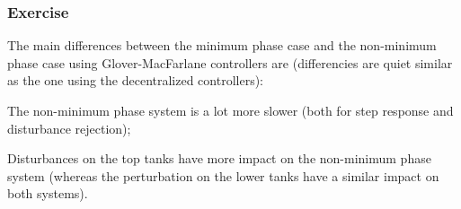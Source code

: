 \subsubsection{Exercise} 

The main differences between the minimum phase case and the non-minimum phase case using Glover-MacFarlane controllers are (differencies are quiet similar as the one using the decentralized controllers):
\begin{shortitemize}
    \item The non-minimum phase system is a lot more slower (both for step response and disturbance rejection);
    \item Disturbances on the top tanks have more impact on the non-minimum phase system (whereas the perturbation on the lower tanks have a similar impact on both systems).
\end{shortitemize}

